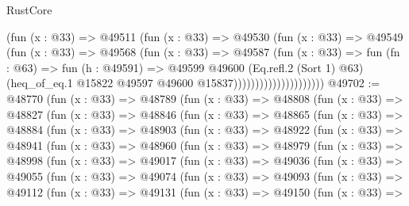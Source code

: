 \begin{lexlean}{RustCore}
\begin{coremodule}
                                (fun (x : @33) =>
                                @49511
                                  (fun (x : @33) =>
                                  @49530
                                    (fun (x : @33) =>
                                    @49549
                                      (fun (x : @33) =>
                                      @49568
                                        (fun (x : @33) =>
                                        @49587
                                          (fun (x : @33) =>
                                          fun (fn : @63) =>
                                          fun (h : @49591) =>
                                          @49599
                                            @49600
                                            (Eq.refl.{2} (Sort 1) @63)
                                            (heq_of_eq.{1}
                                              @15822
                                              @49597
                                              @49600
                                              @15837)))))))))))))))))))))
@49702 := @48770
    (fun (x : @33) =>
    @48789
      (fun (x : @33) =>
      @48808
        (fun (x : @33) =>
        @48827
          (fun (x : @33) =>
          @48846
            (fun (x : @33) =>
            @48865
              (fun (x : @33) =>
              @48884
                (fun (x : @33) =>
                @48903
                  (fun (x : @33) =>
                  @48922
                    (fun (x : @33) =>
                    @48941
                      (fun (x : @33) =>
                      @48960
                        (fun (x : @33) =>
                        @48979
                          (fun (x : @33) =>
                          @48998
                            (fun (x : @33) =>
                            @49017
                              (fun (x : @33) =>
                              @49036
                                (fun (x : @33) =>
                                @49055
                                  (fun (x : @33) =>
                                  @49074
                                    (fun (x : @33) =>
                                    @49093
                                      (fun (x : @33) =>
                                      @49112
                                        (fun (x : @33) =>
                                        @49131
                                          (fun (x : @33) =>
                                          @49150
                                            (fun (x : @33) =>

\end{coremodule}
\end{lexlean}
